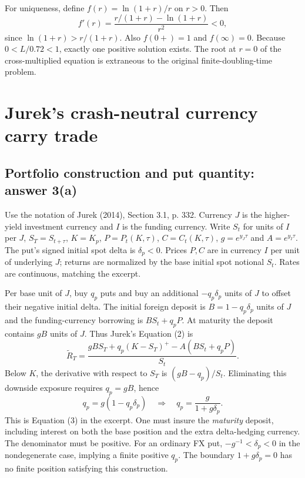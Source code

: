 \documentclass[11pt,letterpaper]{article}
\begin{document}
For uniqueness, define $f(r)=\ln(1+r)/r$ on $r>0$. Then
\begin{equation}
f'(r)=\frac{r/(1+r)-\ln(1+r)}{r^2}<0,
\end{equation}
since $\ln(1+r)>r/(1+r)$. Also $f(0+)=1$ and $f(\infty)=0$.
Because $0<L/0.72<1$, exactly one positive solution exists. The root at $r=0$
of the cross-multiplied equation is extraneous to the original finite-doubling-time problem.
\clearpage
\section{Jurek's crash-neutral currency carry trade}
\subsection{Portfolio construction and put quantity: answer 3(a)}
Use the notation of Jurek (2014), Section 3.1, p. 332. Currency $J$ is the
higher-yield investment currency and $I$ is the funding currency. Write $S_t$
for units of $I$ per $J$, $S_T=S_{t+\tau}$, $K=K_p$, $P=P_t(K,\tau)$,
$C=C_t(K,\tau)$, $g=e^{y_J\tau}$ and $A=e^{y_I\tau}$.
The put's signed initial spot delta is $\delta_p<0$. Prices $P,C$ are in currency
$I$ per unit of underlying $J$; returns are normalized by the base initial spot
notional $S_t$. Rates are continuous, matching the excerpt.

Per base unit of $J$, buy $q_p$ puts and buy an additional $-q_p\delta_p$ units
of $J$ to offset their negative initial delta. The initial foreign deposit is
$B=1-q_p\delta_p$ units of $J$ and the funding-currency borrowing is
$BS_t+q_pP$. At maturity the deposit contains $gB$ units of $J$. Thus Jurek's
Equation (2) is
\begin{equation}
\widetilde R_T=\frac{gBS_T+q_p(K-S_T)^+-A(BS_t+q_pP)}{S_t}.
\label{eq:funded}
\end{equation}
Below $K$, the derivative with respect to $S_T$ is $(gB-q_p)/S_t$.
Eliminating this downside exposure requires $q_p=gB$, hence
\begin{equation}
q_p=g(1-q_p\delta_p)
\quad\Longrightarrow\quad
\boxed{q_p=\frac{g}{1+g\delta_p}.}\label{eq:q}
\end{equation}
This is Equation (3) in the excerpt. One must insure the \emph{maturity} deposit,
including interest on both the base position and the extra delta-hedging currency.
The denominator must be positive. For an ordinary FX put,
$-g^{-1}<\delta_p<0$ in the nondegenerate case, implying a finite positive $q_p$.
The boundary $1+g\delta_p=0$ has no finite position satisfying this construction.
\end{document}
